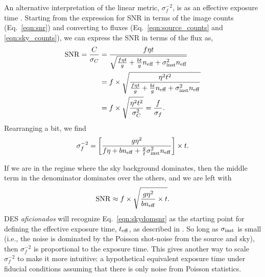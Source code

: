 \documentclass[DM,authoryear,toc]{lsstdoc}
\begin{document}
An alternative interpretation of the linear metric, $\sigma_f^{-2}$, is as an effective exposure time \citep{Neilsen:2016}. Starting from the expression for SNR in terms of the image counts (Eq.~\ref{eqn:snr}) and converting to fluxes (Eq.~\ref{eqn:source_counts} and \ref{eqn:sky_counts}), we can express the SNR in terms of the flux as,
\begin{align}
{\rm SNR} = \frac{C}{\sigma_C} &= \frac{f \eta t}{\sqrt{\frac{f \eta t}{g} + \frac{b t}{g}n_{\rm eff} + \sigma_{\rm inst}^2 n_{\rm eff}}} \\
& = f \times \sqrt{ \frac{\eta^2 t^2}{\frac{f \eta t}{g} + \frac{b t}{g}n_{\rm eff} + \sigma_{\rm inst}^2 n_{\rm eff}}} \\
& = f \times \sqrt{ \frac{\eta^2 t^2}{\sigma_C^2} } = \frac{f}{\sigma_f}.
\end{align}
Rearranging a bit, we find
\begin{equation}
\sigma_f^{-2} = \left[ \frac{g \eta^2}{f \eta + b n_{\rm eff} + \frac{g}{t}\sigma_{\rm inst}^2 n_{\rm eff}}  \right] \times t .
\end{equation}

If we are in the regime where the sky background dominates, then the middle term in the denominator dominates over the others, and we are left with
\begin{equation}
\label{eqn:skydomsnr}
    {\rm SNR} \approx f \times \sqrt{ \frac{g \eta^2}{ b n_{\rm eff}}  \times t }.
\end{equation}
DES {\it aficionados} will recognize Eq.~\ref{eqn:skydomsnr} as the starting point for defining the effective exposure time, $t_{\rm eff}$, as described in \citet{Neilsen:2016}.
So long as $\sigma_{\rm inst}$ is small (i.e., the noise is dominated by the Poisson shot-noise from the source and sky), then $\sigma_f^{-2}$ is proportional to the exposure time.
This gives another way to scale $\sigma_f^{-2}$ to make it more intuitive: a hypothetical equivalent exposure time under fiducial conditions assuming that there is only noise from Poisson statistics. 
\end{document}
